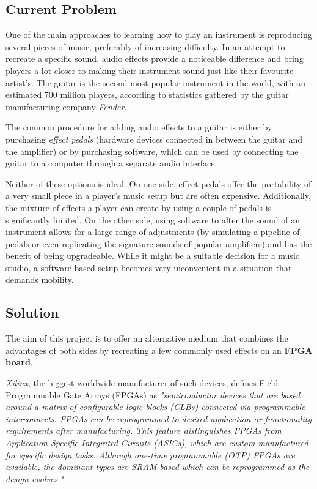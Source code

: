 
\subsection*{Current Problem}

One of the main approaches to learning how to play an instrument is reproducing several pieces of music, preferably of increasing difficulty. In an attempt to recreate a specific sound, audio effects provide a noticeable difference and bring players a lot closer to making their instrument sound just like their favourite artist's.
The guitar is the second most popular instrument in the world, with an estimated 700 million players, according to statistics\cite{700mil} gathered by the guitar manufacturing company \textit{Fender}. 

The common procedure for adding audio effects to a guitar is either by purchasing \textit{effect pedals} (hardware devices connected in between the guitar and the amplifier) or by purchasing software, which can be used by connecting the guitar to a computer through a separate audio interface.

Neither of these options is ideal. On one side, effect pedals offer the portability of a very small piece in a player's music setup but are often expensive. Additionally, the mixture of effects a player can create by using a couple of pedals is significantly limited. On the other side, using software to alter the sound of an instrument allows for a large range of adjustments (by simulating a pipeline of pedals or even replicating the signature sounds of popular amplifiers) and has the benefit of being upgradeable. While it might be a suitable decision for a music studio, a software-based setup becomes very inconvenient in a situation that demands mobility.

\subsection*{Solution}

The aim of this project is to offer an alternative medium that combines the advantages of both sides by recreating a few commonly used effects on an \textbf{FPGA board}.

\textit{Xilinx}, the biggest worldwide manufacturer of such devices, defines Field Programmable Gate Arrays (FPGAs) as \textit{"semiconductor devices that are based around a matrix of configurable logic blocks (CLBs) connected via programmable interconnects. FPGAs can be reprogrammed to desired application or functionality requirements after manufacturing. This feature distinguishes FPGAs from Application Specific Integrated Circuits (ASICs), which are custom manufactured for specific design tasks. Although one-time programmable (OTP) FPGAs are available, the dominant types are SRAM based which can be reprogrammed as the design evolves."}\cite{whatisanfpga}

